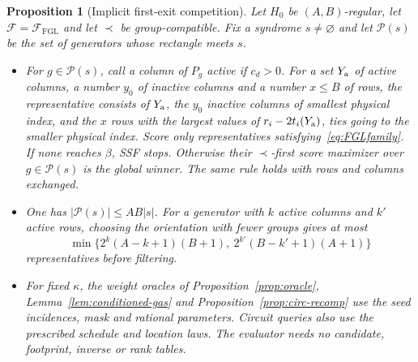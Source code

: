 \documentclass[10pt,twocolumn]{article}
\newtheorem{proposition}[theorem]{Proposition}
\theoremstyle{definition}
\newcommand{\FF}{\mathcal{F}}
\begin{document}
\begin{proposition}[Implicit first-exit competition]
\label{prop:implicit-competition}
Let $H_0$ be $(A,B)$-regular, let $\FF=\FF_{\mathrm{FGL}}$ and let
$\prec$ be group-compatible. Fix a syndrome $s\neq\varnothing$ and let
$\mathcal P(s)$ be the set of generators whose rectangle meets $s$.
\begin{itemize}
\item[(a)] For $g\in\mathcal P(s)$, call a column of $P_g$ active if
$c_d>0$. For a set $Y_{\rm a}$ of active columns, a number $y_0$ of
inactive columns and a number $x\le B$ of rows, the
\emph{representative} consists of $Y_{\rm a}$, the $y_0$ inactive
columns of smallest physical index, and the $x$ rows with the largest
values of $r_i-2t_i(Y_{\rm a})$, ties going to the smaller physical
index. Score only representatives satisfying~\eqref{eq:FGLfamily}.
If none reaches $\beta$, SSF stops. Otherwise their $\prec$-first
score maximizer over $g\in\mathcal P(s)$ is the global winner.
The same rule holds with rows and columns exchanged.
\item[(b)] One has $|\mathcal P(s)|\le AB|s|$. For a generator with
$k$ active columns and $k'$ active rows, choosing the orientation with
fewer groups gives at most
\[
 \min\bigl\{2^{k}(A-k+1)(B+1),\ 2^{k'}(B-k'+1)(A+1)\bigr\}
\]
representatives before filtering.
\item[(c)] For fixed $\kappa$, the weight oracles of
Proposition~\ref{prop:oracle}, Lemma~\ref{lem:conditioned-gas} and
Proposition~\ref{prop:circ-recomp} use the seed incidences, mask and
rational parameters. Circuit queries also use the prescribed schedule
and location laws. The evaluator needs no candidate, footprint,
inverse or rank tables.
\end{itemize}
\end{proposition}
\end{document}
